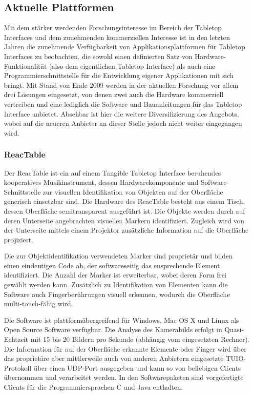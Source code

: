 
\subsection{Aktuelle Plattformen} %
\label{sub:aktuelle_plattformen}
Mit dem stärker werdenden Forschungsinteresse im Bereich der Tabletop Interfaces und dem zunehmenden kommerziellen Interesse ist in den letzten Jahren die zunehmende Verfügbarkeit von Applikationsplattformen für Tabletop Interfaces zu beobachten, die sowohl einen definierten Satz von Hardware-Funktionalität (also dem eigentlichen Tabletop Interface) als auch eine Programmierschnittstelle für die Entwicklung eigener Applikationen mit sich bringt. Mit Stand von Ende 2009 werden in der aktuellen Forschung vor allem drei Lösungen eingesetzt, von denen zwei auch die Hardware kommerziell vertreiben und eine lediglich die Software und Bauanleitungen für das Tabletop Interface anbietet. Absehbar ist hier die weitere Diversifizierung des Angebots, wobei auf die neueren Anbieter an dieser Stelle jedoch nicht weiter eingegangen wird.

\subsubsection{ReacTable} %
\label{ssub:reactable}

Der ReacTable \citep{Kaltenbrunner06} ist ein auf einem Tangible Tabletop Interface beruhendes kooperatives Musikinstrument, dessen Hardwarekomponente und Software-Schnittstelle zur visuellen Identifikation von Objekten auf der Oberfläche generisch einsetzbar sind. Die Hardware des ReacTable besteht aus einem Tisch, dessen Oberfläche semitransparent ausgeführt ist. Die Objekte werden durch auf deren Unterseite angebrachten visuellen Markern identifiziert. Zugleich wird von der Unterseite mittels einem Projektor zusätzliche Information auf die Oberfläche projiziert.

Die zur Objektidentifikation verwendeten Marker sind proprietär und bilden einen eindeutigen Code ab, der softwareseitig das ensprechende Element identifiziert. Die Anzahl der Marker ist erweiterbar, wobei deren Form frei gewählt werden kann. Zusätzlich zu Identifikation von Elementen kann die Software auch Fingerberührungen visuell erkennen, wodurch die Oberfläche multi-touch-fähig wird.

Die Software ist plattformübergreifend für Windows, Mac OS X und Linux als Open Source Software verfügbar. Die Analyse des Kamerabilds erfolgt in Quasi-Echtzeit mit 15 bis 20 Bildern pro Sekunde (abhängig vom eingesetzten Rechner). Die Information für auf der Oberfläche erkannte Elemente oder Finger wird über das proprietäre aber mittlerweile auch von anderen Anbietern eingesetzte TUIO-Protokoll über einen \gls{UDP}-Port ausgegeben und kann so von beliebigen Clients übernommen und verarbeitet werden. In den Softwarepaketen sind vorgefertigte Clients für die Programmiersprachen C und Java enthalten.

